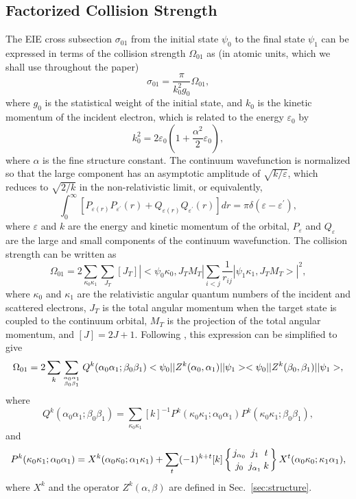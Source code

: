 \subsection{Factorized Collision Strength}
The EIE cross subsection $\sigma_{01}$ from the initial state $\psi_0$ to the
final state $\psi_1$ can be expressed in terms of the collision strength
$\Omega_{01}$ as (in atomic units, which we shall use throughout the paper) 
\begin{equation}
\sigma_{01} = \frac{\pi}{k_0^2g_0}\Omega_{01},
\end{equation}
where $g_0$ is the statistical weight of the initial state, and $k_0$ is the
kinetic momentum of the incident electron, which is related to the energy
$\varepsilon_0$ by
\begin{equation}
k_0^2 = 2\varepsilon_0\left(1+\frac{\alpha^2}{2}\varepsilon_0\right),
\end{equation}
where $\alpha$ is the fine structure constant. The continuum wavefunction
is normalized so that the large component has an asymptotic amplitude of
$\sqrt{k/\varepsilon}$, which reduces to $\sqrt{2/k}$ in the non-relativistic
limit, or equivalently,
\begin{equation}
\int_0^\infty \left[P_{\varepsilon(r)}P_{\varepsilon^\prime}(r)
+Q_{\varepsilon(r)}Q_{\varepsilon^\prime}(r)\right]d r = 
\pi\delta(\varepsilon - \varepsilon^\prime),
\end{equation}
where $\varepsilon$ and $k$ are the energy and kinetic momentum of the
orbital, $P_\varepsilon$ and $Q_\varepsilon$ are the large and small
components of the continuum wavefunction. The collision strength can be
written as
\begin{equation}
\Omega_{01} = 2\sum_{\kappa_0\kappa_1}\sum_{J_T}[J_T]
|<\psi_0\kappa_0,J_TM_T|\sum_{i<j}\frac{1}{r_{ij}}|\psi_1\kappa_1,J_TM_T>|^2,
\end{equation}
where $\kappa_0$ and $\kappa_1$ are the relativistic angular quantum numbers of
the incident and scattered electrons, $J_T$ is the total angular momentum
when the target state is coupled to the continuum orbital, $M_T$ is the
projection of the total angular momentum, and  $[J] = 2J+1$. 
Following \citet{barshalom:1988a}, this expression can be simplified to give
\begin{equation}
\label{eq_cs}
\Omega_{01} = 2\sum_{k}\sum_{\alpha_0\alpha_1\atop\beta_0\beta_1}
Q^k(\alpha_0\alpha_1;\beta_0\beta_1)
<\psi_0||Z^k(\alpha_0,\alpha_1)||\psi_1>
<\psi_0||Z^k(\beta_0,\beta_1)||\psi_1>,
\end{equation}
where 
\begin{equation}
\label{eq_Qk}
Q^k(\alpha_0\alpha_1;\beta_0\beta_1) = \sum_{\kappa_0\kappa_1}[k]^{-1}
P^k(\kappa_0\kappa_1;\alpha_0\alpha_1)P^k(\kappa_0\kappa_1;\beta_0\beta_1),
\end{equation}
and 
\begin{equation}
\label{eq_Pk}
P^k(\kappa_0\kappa_1;\alpha_0\alpha_1)=
X^k(\alpha_0\kappa_0;\alpha_1\kappa_1)+\sum_{t}
(-1)^{k+t}[k]\sixj{j_{\alpha_0}}{j_1}{t}{j_0}{j_{\alpha_1}}{k}
X^t(\alpha_0\kappa_0;\kappa_1\alpha_1),
\end{equation}
where $X^k$ and the operator $Z^k(\alpha,\beta)$ are defined in
Sec.~\ref{sec:structure}. 
 
